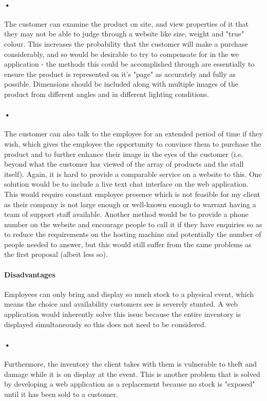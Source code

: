 ﻿\documentclass{article}
\begin{document}
    \paragraph{•}
    The customer can examine the product on site, and view properties of it that they may not be able to judge through a website like size, weight and "true" colour.
    This increases the probability that the customer will make a purchase considerably, and so would be desirable to try to compensate for in the we application - the methods this could be accomplished through are essentially to ensure the product is represented on it's "page" as accurately and fully as possible.
    Dimensions should be included along with multiple images of the product from different angles and in different lighting conditions.
    \paragraph{•}
    The customer can also talk to the employee for an extended period of time if they wish, which gives the employee the opportunity to convince them to purchase the product and to further enhance their image in the eyes of the customer (i.e. beyond what the customer has viewed of the array of products and the stall itself).
    Again, it is hard to provide a comparable service on a website to this.
    One solution would be to include a live text chat interface on the web application.
    This would require constant employee presence which is not feasible for my client as their company is not large enough or well-known enough to warrant having a team of support staff available.
    Another method would be to provide a phone number on the website and encourage people to call it if they have enquiries so as to reduce the requirements on the hosting machine and potentially the number of people needed to answer, but this would still suffer from the same problems as the first proposal (albeit less so).
    \paragraph{Disadvantages}
    Employees can only bring and display so much stock to a physical event, which means the choice and availability customers see is severely stunted.
    A web application would inherently solve this issue because the entire inventory is displayed simultaneously so this does not need to be considered.
    \paragraph{•}
    Furthermore, the inventory the client takes with them is vulnerable to theft and damage while it is on display at the event.
    This is another problem that is solved by developing a web application as a replacement because no stock is "exposed" until it has been sold to a customer.
\end{document}
